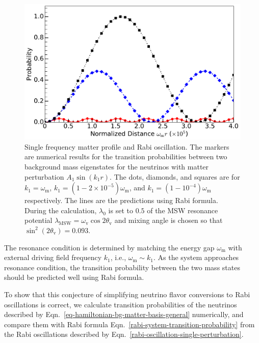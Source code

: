 \begin{figure}[!htbp]
                \includegraphics[width=\columnwidth]{chapters/assets/rabi/rabiOscillationsNeutrinoCoincidence-single-frequency}
                \caption{Single frequency matter profile and Rabi oscillation. The markers are numerical results for the transition probabilities between two background mass eigenstates for the neutrinos with matter perturbation $A_1\sin(k_1 r)$. The dots, diamonds, and squares are for $k_1=\omega_{\mathrm m}$, $k_1=(1-2\times 10^{-5})\omega_{\mathrm m}$, and $k_1=(1-10^{-4})\omega_{\mathrm m}$ respectively. The lines are the predictions using Rabi formula. During the calculation, $\lambda_0$ is set to $0.5$ of the MSW resonance potential $\lambda_{\mathrm{MSW}}=\omega_{\mathrm{v}}\cos 2\theta_{\mathrm v}$ and mixing angle is chosen so that $\sin^2(2\theta_{\mathrm v}) = 0.093$.}
                \label{fig-rabiOscillationsNeutrinoCoincidence}
\end{figure}

The resonance condition is determined by matching the energy gap $\omega_{\mathrm m}$ with external driving field frequency $k_1$, i.e., $\omega_{\mathrm m} \sim k_1$. As the system approaches resonance condition, the transition probability between the two mass states should be predicted well using Rabi formula.

To show that this conjecture of simplifying neutrino flavor conversions to Rabi oscillations is correct, we calculate transition probabilities of the neutrinos described by Eqn.~\ref{eq-hamiltonian-bg-matter-basis-general} numerically, and compare them with Rabi formula Eqn.~\ref{rabi-system-transition-probability} from the Rabi oscillations described by Eqn.~\ref{rabi-oscillation-single-perturbation}.


